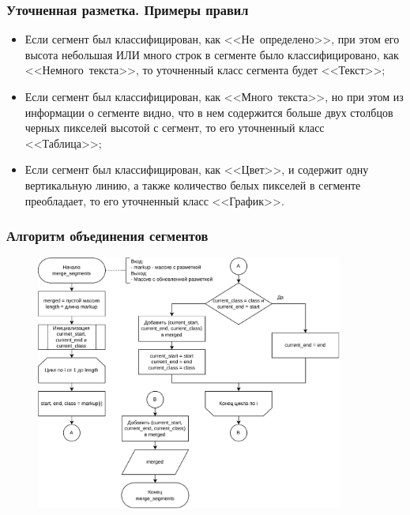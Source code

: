 \documentclass[gray]{beamer}
\begin{document}
\begin{frame}
    \frametitle{Уточненная разметка. Примеры правил}
    \begin{itemize}
        \item Если сегмент был классифицирован, как <<Не~определено>>, при этом его высота небольшая ИЛИ много строк в сегменте было классифицировано, как <<Немного~текста>>, то уточненный класс сегмента будет <<Текст>>;
        \item Если сегмент был классифицирован, как <<Много~текста>>, но при этом из информации о сегменте видно, что в нем содержится больше двух столбцов черных пикселей высотой с сегмент, то его уточненный класс <<Таблица>>;
        \item Если сегмент был классифицирован, как <<Цвет>>, и содержит одну вертикальную линию, а также количество белых пикселей в сегменте преобладает, то его уточненный класс <<График>>.
    \end{itemize}
\end{frame}

\begin{frame}
    \frametitle{Алгоритм объединения сегментов}
    \begin{figure}[H]
        \centering
        \hspace{1cm}\includegraphics[width=0.9\textwidth]{diag/pres-merge.pdf}
    \end{figure}
\end{frame}
\end{document}
